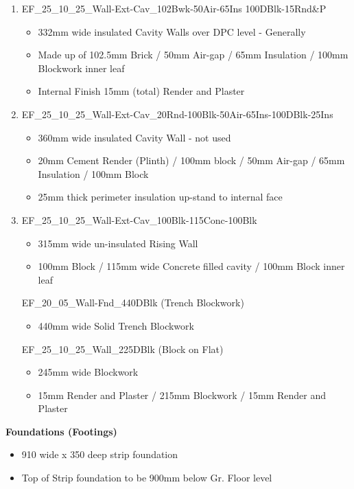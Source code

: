 \begin{enumerate}
	\item EF\_25\_10\_25\_Wall-Ext-Cav\_102Bwk-50Air-65Ins 100DBlk-15Rnd\&P
	\begin{itemize}
		\item 332mm wide insulated Cavity Walls over DPC level - Generally
		\item Made up of 102.5mm Brick / 50mm Air-gap / 65mm Insulation / 100mm Blockwork inner leaf
		\item Internal Finish 15mm (total) Render and Plaster
	\end{itemize}
	
	\item EF\_25\_10\_25\_Wall-Ext-Cav\_20Rnd-100Blk-50Air-65Ins-100DBlk-25Ins
	\begin{itemize}
		\item 360mm wide insulated Cavity Wall - not used
		\item 20mm Cement Render (Plinth) / 100mm block / 50mm Air-gap / 65mm Insulation / 100mm Block
		\item 25mm thick perimeter insulation up-stand to internal face
	\end{itemize}
	
	
	\item EF\_25\_10\_25\_Wall-Ext-Cav\_100Blk-115Conc-100Blk
	\begin{itemize}
		\item 315mm wide un-insulated Rising Wall
		\item 100mm Block / 115mm wide Concrete filled cavity / 100mm Block inner leaf
	\end{itemize}
	
	
	EF\_20\_05\_Wall-Fnd\_440DBlk (Trench Blockwork)
	\begin{itemize}
		\item 440mm wide Solid Trench Blockwork
	\end{itemize}

	EF\_25\_10\_25\_Wall\_225DBlk (Block on Flat)
	\begin{itemize}
		\item 245mm wide Blockwork
		\item 15mm Render and Plaster / 215mm Blockwork / 15mm Render and Plaster
	\end{itemize}

\end{enumerate}

\textbf{Foundations (Footings)}

\begin{itemize}
	\item 910 wide x 350 deep strip foundation
	\item Top of Strip foundation to be 900mm below Gr. Floor level
\end{itemize}



